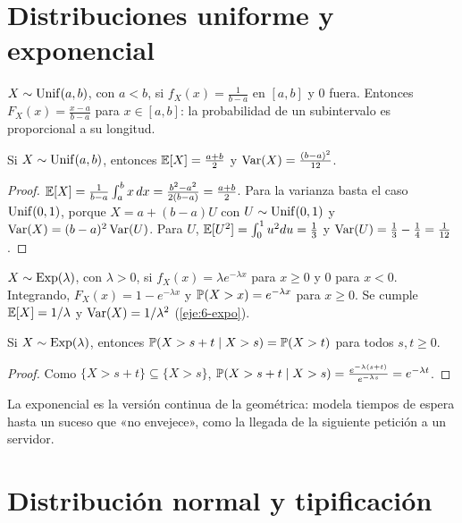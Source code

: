\section{Distribuciones uniforme y exponencial}

\begin{definicion}[Uniforme]
$X\sim\operatorname{Unif}(a,b)$, con $a<b$, si $f_X(x)=\frac{1}{b-a}$ en $[a,b]$ y $0$ fuera. Entonces $F_X(x)=\frac{x-a}{b-a}$ para $x\in[a,b]$: la probabilidad de un subintervalo es proporcional a su longitud.
\end{definicion}

\begin{proposicion}\label{prop:t6-unif}
Si $X\sim\operatorname{Unif}(a,b)$, entonces $\mathbb{E}[X]=\frac{a+b}{2}$ y $\operatorname{Var}(X)=\frac{(b-a)^{2}}{12}$.
\end{proposicion}

\begin{proof}
$\mathbb{E}[X]=\frac1{b-a}\int_a^bx\,dx=\frac{b^{2}-a^{2}}{2(b-a)}=\frac{a+b}2$. Para la varianza basta el caso $\operatorname{Unif}(0,1)$, porque $X=a+(b-a)U$ con $U\sim\operatorname{Unif}(0,1)$ y $\operatorname{Var}(X)=(b-a)^{2}\operatorname{Var}(U)$. Para $U$, $\mathbb{E}[U^{2}]=\int_0^1u^{2}du=\frac13$ y $\operatorname{Var}(U)=\frac13-\frac14=\frac1{12}$.
\end{proof}

\begin{definicion}[Exponencial]
$X\sim\operatorname{Exp}(\lambda)$, con $\lambda>0$, si $f_X(x)=\lambda e^{-\lambda x}$ para $x\ge0$ y $0$ para $x<0$. Integrando, $F_X(x)=1-e^{-\lambda x}$ y $\mathbb{P}(X>x)=e^{-\lambda x}$ para $x\ge0$. Se cumple $\mathbb{E}[X]=1/\lambda$ y $\operatorname{Var}(X)=1/\lambda^{2}$ (\cref{eje:6-expo}).
\end{definicion}

\begin{proposicion}\label{prop:t6-memoria}
Si $X\sim\operatorname{Exp}(\lambda)$, entonces $\mathbb{P}(X>s+t\mid X>s)=\mathbb{P}(X>t)$ para todos $s,t\ge0$.
\end{proposicion}

\begin{proof}
Como $\{X>s+t\}\subseteq\{X>s\}$, $\mathbb{P}(X>s+t\mid X>s)=\frac{e^{-\lambda(s+t)}}{e^{-\lambda s}}=e^{-\lambda t}$.
\end{proof}

La exponencial es la versión continua de la geométrica: modela tiempos de espera hasta un suceso que «no envejece», como la llegada de la siguiente petición a un servidor.

\section{Distribución normal y tipificación}


